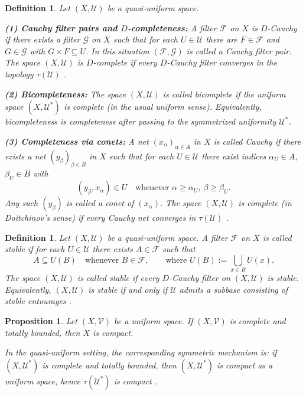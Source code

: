 \documentclass[preprint,12pt]{elsarticle}
\newtheorem{proposition}[theorem]{Proposition}
\newtheorem{definition}[theorem]{Definition}
\begin{document}
\begin{definition}
\label{def:qu:cauchy}
Let $(X,\mathcal{U})$ be a quasi-uniform space.

\smallskip
\noindent\textbf{(1) Cauchy filter pairs and $D$-completeness:}
A filter $\mathcal{F}$ on $X$ is \emph{$D$-Cauchy} if there exists a
filter $\mathcal{G}$ on $X$ such that for each $U\in\mathcal{U}$ there
are $F\in\mathcal{F}$ and $G\in\mathcal{G}$ with $G\times F\subseteq U$.
In this situation $(\mathcal{F},\mathcal{G})$ is called a \emph{Cauchy
filter pair}. The space $(X,\mathcal{U})$ is \emph{$D$-complete} if
every $D$-Cauchy filter converges in the topology $\tau(\mathcal{U})$
\cite{Doitchinov1991}.

\smallskip
\noindent\textbf{(2) Bicompleteness:}
The space $(X,\mathcal{U})$ is called \emph{bicomplete} if the uniform
space $(X,\mathcal{U}^{*})$ is complete (in the usual uniform sense).
Equivalently, bicompleteness is completeness after passing to the
symmetrized uniformity $\mathcal{U}^{*}$.

\smallskip
\noindent\textbf{(3) Completeness via conets:}
A net $(x_\alpha)_{\alpha\in A}$ in $X$ is called \emph{Cauchy} if there
exists a net $(y_\beta)_{\beta\in B}$ in $X$ such that for each
$U\in\mathcal{U}$ there exist indices $\alpha_U\in A$, $\beta_U\in B$
with
\[
(y_\beta,x_\alpha)\in U
\quad\text{whenever }\alpha\ge \alpha_U,\ \beta\ge \beta_U.
\]
Any such $(y_\beta)$ is called a \emph{conet} of $(x_\alpha)$. The space
$(X,\mathcal{U})$ is \emph{complete} (in Doitchinov's sense) if every
Cauchy net converges in $\tau(\mathcal{U})$ \cite{Doitchinov1991}.
\end{definition}

\begin{definition}\label{def:qu:stability}
Let $(X,\mathcal{U})$ be a quasi-uniform space. A filter $\mathcal{F}$
on $X$ is called \emph{stable} if for each $U\in\mathcal{U}$ there exists
$A\in\mathcal{F}$ such that
\[
A\subseteq U(B)\quad\text{whenever }B\in\mathcal{F},
\qquad\text{where }U(B):=\bigcup_{x\in B}U(x).
\]
The space $(X,\mathcal{U})$ is called \emph{stable} if every $D$-Cauchy
filter on $(X,\mathcal{U})$ is stable. Equivalently, $(X,\mathcal{U})$
is stable if and only if $\mathcal{U}$ admits a subbase consisting of
stable entourages \cite{KunziJunnila1993}.
\end{definition}

\begin{proposition}
\label{prop:qu:complete-tb-compact}
Let $(X,\mathcal{V})$ be a \emph{uniform} space. If $(X,\mathcal{V})$ is
complete and totally bounded, then $X$ is compact.

\medskip
\noindent In the quasi-uniform setting, the corresponding symmetric
mechanism is: if $(X,\mathcal{U}^{*})$ is complete and totally bounded,
then $(X,\mathcal{U}^{*})$ is compact as a uniform space, hence
$\tau(\mathcal{U}^{*})$ is compact \cite{Isbell1964,FletcherLindgren,Kunzi2001}.
\end{proposition}
\end{document}
